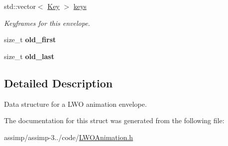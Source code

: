 \begin{DoxyCompactItemize}
\item 
\hypertarget{struct_assimp_1_1_l_w_o_1_1_envelope_a217a3d6c7da93d662e57905b1c29f341}{std\+::vector$<$ \hyperlink{struct_assimp_1_1_l_w_o_1_1_key}{Key} $>$ \hyperlink{struct_assimp_1_1_l_w_o_1_1_envelope_a217a3d6c7da93d662e57905b1c29f341}{keys}}\label{struct_assimp_1_1_l_w_o_1_1_envelope_a217a3d6c7da93d662e57905b1c29f341}

\begin{DoxyCompactList}\small\item\em Keyframes for this envelope. \end{DoxyCompactList}\item 
\hypertarget{struct_assimp_1_1_l_w_o_1_1_envelope_a4f0d2e70cb62a75e718d8588f1f6923c}{size\+\_\+t {\bfseries old\+\_\+first}}\label{struct_assimp_1_1_l_w_o_1_1_envelope_a4f0d2e70cb62a75e718d8588f1f6923c}

\item 
\hypertarget{struct_assimp_1_1_l_w_o_1_1_envelope_af5036355ce073d6e2334bb7d693e9038}{size\+\_\+t {\bfseries old\+\_\+last}}\label{struct_assimp_1_1_l_w_o_1_1_envelope_af5036355ce073d6e2334bb7d693e9038}

\end{DoxyCompactItemize}


\subsection{Detailed Description}
Data structure for a L\+W\+O animation envelope. 

The documentation for this struct was generated from the following file\+:\begin{DoxyCompactItemize}
\item 
assimp/assimp-\/3../code/\hyperlink{_l_w_o_animation_8h}{L\+W\+O\+Animation.\+h}\end{DoxyCompactItemize}
